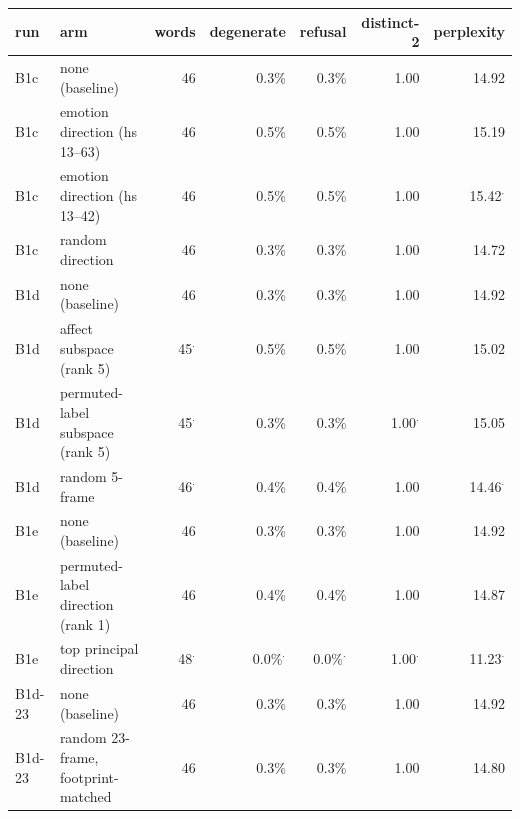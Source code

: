 \begin{tabular}{llrrrrr}
\toprule
run & arm & words & degenerate & refusal & distinct-2 & perplexity \\
\midrule
B1c & none (baseline) & 46 & 0.3\% & 0.3\% & 1.00 & 14.92 \\
B1c & emotion direction (hs 13--63) & 46 & 0.5\% & 0.5\% & 1.00 & 15.19 \\
B1c & emotion direction (hs 13--42) & 46 & 0.5\% & 0.5\% & 1.00 & 15.42$^{\cdot}$ \\
B1c & random direction & 46 & 0.3\% & 0.3\% & 1.00 & 14.72 \\
\midrule
B1d & none (baseline) & 46 & 0.3\% & 0.3\% & 1.00 & 14.92 \\
B1d & affect subspace (rank 5) & 45$^{\cdot}$ & 0.5\% & 0.5\% & 1.00 & 15.02 \\
B1d & permuted-label subspace (rank 5) & 45$^{\cdot}$ & 0.3\% & 0.3\% & 1.00$^{\cdot}$ & 15.05 \\
B1d & random 5-frame & 46$^{\cdot}$ & 0.4\% & 0.4\% & 1.00 & 14.46$^{\cdot}$ \\
\midrule
B1e & none (baseline) & 46 & 0.3\% & 0.3\% & 1.00 & 14.92 \\
B1e & permuted-label direction (rank 1) & 46 & 0.4\% & 0.4\% & 1.00 & 14.87 \\
B1e & top principal direction & 48$^{\cdot}$ & 0.0\%$^{\cdot}$ & 0.0\%$^{\cdot}$ & 1.00$^{\cdot}$ & 11.23$^{\cdot}$ \\
\midrule
B1d-23 & none (baseline) & 46 & 0.3\% & 0.3\% & 1.00 & 14.92 \\
B1d-23 & random 23-frame, footprint-matched & 46 & 0.3\% & 0.3\% & 1.00 & 14.80 \\
\bottomrule
\end{tabular}
